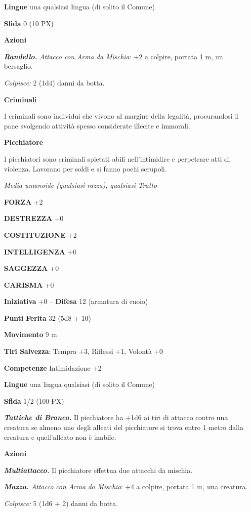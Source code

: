 \begin{multicols}{2}
\textbf{Lingue} una qualsiasi lingua (di solito il Comune)

\textbf{Sfida} 0 (10 PX)

\textbf{Azioni}

\textit{\textbf{Randello.} Attacco con Arma da Mischia}: +2 a colpire, portata 1 m, un bersaglio.

\textit{Colpisce:} 2 (1d4) danni da botta.

\medskip\textbf{Criminali}

I criminali sono individui che vivono al margine della legalità, procurandosi il pane svolgendo attività spesso considerate illecite e immorali.

\medskip\textbf{Picchiatore}

I picchiatori sono criminali spietati abili nell'intimidire e perpetrare atti di violenza. Lavorano per soldi e si fanno pochi scrupoli.

\textit{Media umanoide (qualsiasi razza), qualsiasi Tratto}

\textbf{FORZA} +2

\textbf{DESTREZZA} +0

\textbf{COSTITUZIONE} +2

\textbf{INTELLIGENZA} +0

\textbf{SAGGEZZA} +0

\textbf{CARISMA} +0

\textbf{Iniziativa} +0 -- \textbf{Difesa} 12 (armatura di cuoio)

\textbf{Punti Ferita} 32 (5d8 + 10)

\textbf{Movimento} 9 m

\textbf{Tiri Salvezza}: Tempra +3, Riflessi +1, Volontà +0

\textbf{Competenze} Intimidazione +2

\textbf{Lingue} una lingua qualsiasi (di solito il Comune)

\textbf{Sfida} 1/2 (100 PX)

\textit{\textbf{Tattiche di Branco.}} Il picchiatore ha +1d6 ai tiri di attacco contro una creatura se almeno uno degli alleati del picchiatore si trova entro 1 metro dalla creatura e quell'alleato non
è inabile.

\textbf{Azioni}

\textit{\textbf{Multiattacco.}} Il picchiatore effettua due attacchi da mischia.

\textit{\textbf{Mazza.} Attacco con Arma da Mischia}: +4 a colpire, portata 1 m, una creatura.

\textit{Colpisce:} 5 (1d6 + 2) danni da botta.


\end{multicols}
